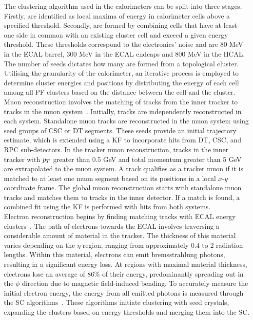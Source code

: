 The clustering algorithm used in the calorimeters can be split into three stages. 
Firstly,  are identified as local maxima of energy in calorimeter cells above a specified threshold. 
Secondly,  are formed by combining cells that have at least one side in common with an existing cluster cell and exceed a given energy threshold. 
These thresholds correspond to the electronics' noise and are 80 MeV in the \ac{ECAL} barrel, 300 MeV in the \ac{ECAL} endcaps and 800 MeV in the \ac{HCAL}. 
The number of seeds dictates how many  are formed from a topological cluster.
Utilising the granularity of the calorimeter, an iterative process is employed to determine cluster energies and positions by distributing the energy of each cell among all \ac{PF} clusters based on the distance between the cell and the cluster. \\

Muon reconstruction involves the matching of tracks from the inner tracker to tracks in the muon system~\cite{CMS:2012nsv,CMS:2018rym}.
Initially, tracks are independently reconstructed in each system. 
Standalone muon tracks are reconstructed in the muon system using seed groups of \ac{CSC} or \ac{DT} segments. 
These seeds provide an initial trajectory estimate, which is extended using a \ac{KF} to incorporate hits from \ac{DT}, \ac{CSC}, and \ac{RPC} sub-detectors. 
In the tracker muon reconstruction, tracks in the inner tracker with $p_{T}$ greater than 0.5 GeV and total momentum greater than 5 GeV are extrapolated to the muon system. 
A track qualifies as a tracker muon if it is matched to at least one muon segment based on its positions in a local $x$-$y$ coordinate frame. 
The global muon reconstruction starts with standalone muon tracks and matches them to tracks in the inner detector. 
If a match is found, a combined fit using the \ac{KF} is performed with hits from both systems. \\

Electron reconstruction begins by finding matching tracks with \ac{ECAL} energy clusters~\cite{CMS:2015xaf}.
The path of electrons towards the \ac{ECAL} involves traversing a considerable amount of material in the tracker. 
The thickness of this material varies depending on the $\eta$ region, ranging from approximately 0.4 to 2 radiation lengths. 
Within this material, electrons can emit bremsstrahlung photons, resulting in a significant energy loss. 
At regions with maximal material thickness, electrons lose an average of 86\% of their energy, predominantly spreading out in the $\phi$ direction due to magnetic field-induced bending. 
To accurately measure the initial electron energy, the energy from all emitted photons is measured through the \ac{SC} algorithms~\cite{PF_CMS}. 
These algorithms initiate clustering with seed crystals, expanding the clusters based on energy thresholds and merging them into the \ac{SC}. \\

